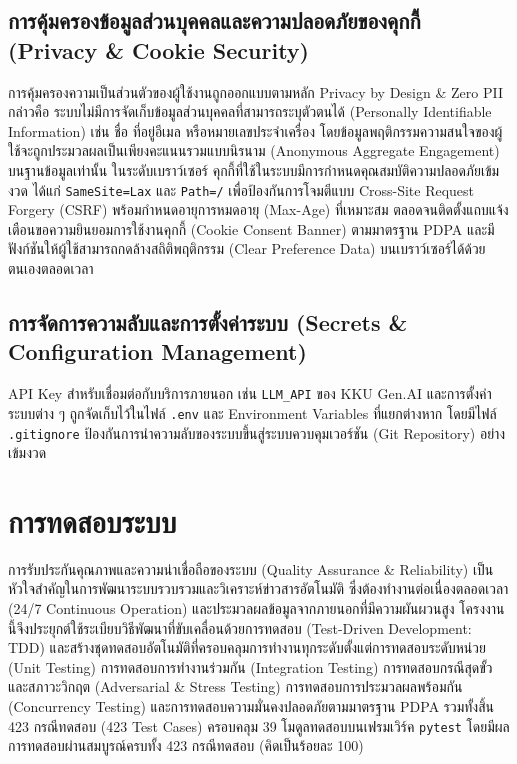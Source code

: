 \subsection{การคุ้มครองข้อมูลส่วนบุคคลและความปลอดภัยของคุกกี้ (Privacy \& Cookie Security)}

การคุ้มครองความเป็นส่วนตัวของผู้ใช้งานถูกออกแบบตามหลัก Privacy by Design \& Zero PII กล่าวคือ ระบบไม่มีการจัดเก็บข้อมูลส่วนบุคคลที่สามารถระบุตัวตนได้ (Personally Identifiable Information) เช่น ชื่อ ที่อยู่อีเมล หรือหมายเลขประจำเครื่อง โดยข้อมูลพฤติกรรมความสนใจของผู้ใช้จะถูกประมวลผลเป็นเพียงคะแนนรวมแบบนิรนาม (Anonymous Aggregate Engagement) บนฐานข้อมูลเท่านั้น ในระดับเบราว์เซอร์ คุกกี้ที่ใช้ในระบบมีการกำหนดคุณสมบัติความปลอดภัยเข้มงวด ได้แก่ \texttt{SameSite=Lax} และ \texttt{Path=/} เพื่อป้องกันการโจมตีแบบ Cross-Site Request Forgery (CSRF) พร้อมกำหนดอายุการหมดอายุ (Max-Age) ที่เหมาะสม ตลอดจนติดตั้งแถบแจ้งเตือนขอความยินยอมการใช้งานคุกกี้ (Cookie Consent Banner) ตามมาตรฐาน PDPA และมีฟังก์ชันให้ผู้ใช้สามารถกดล้างสถิติพฤติกรรม (Clear Preference Data) บนเบราว์เซอร์ได้ด้วยตนเองตลอดเวลา


\subsection{การจัดการความลับและการตั้งค่าระบบ (Secrets \& Configuration Management)}

API Key สำหรับเชื่อมต่อกับบริการภายนอก เช่น \texttt{LLM\_API} ของ KKU Gen.AI และการตั้งค่าระบบต่าง ๆ ถูกจัดเก็บไว้ในไฟล์ \texttt{.env} และ Environment Variables ที่แยกต่างหาก โดยมีไฟล์ \texttt{.gitignore} ป้องกันการนำความลับของระบบขึ้นสู่ระบบควบคุมเวอร์ชัน (Git Repository) อย่างเข้มงวด

\section{การทดสอบระบบ}

การรับประกันคุณภาพและความน่าเชื่อถือของระบบ (Quality Assurance \& Reliability) เป็นหัวใจสำคัญในการพัฒนาระบบรวบรวมและวิเคราะห์ข่าวสารอัตโนมัติ ซึ่งต้องทำงานต่อเนื่องตลอดเวลา (24/7 Continuous Operation) และประมวลผลข้อมูลจากภายนอกที่มีความผันผวนสูง โครงงานนี้จึงประยุกต์ใช้ระเบียบวิธีพัฒนาที่ขับเคลื่อนด้วยการทดสอบ (Test-Driven Development: TDD) และสร้างชุดทดสอบอัตโนมัติที่ครอบคลุมการทำงานทุกระดับตั้งแต่การทดสอบระดับหน่วย (Unit Testing) การทดสอบการทำงานร่วมกัน (Integration Testing) การทดสอบกรณีสุดขั้วและสภาวะวิกฤต (Adversarial \& Stress Testing) การทดสอบการประมวลผลพร้อมกัน (Concurrency Testing) และการทดสอบความมั่นคงปลอดภัยตามมาตรฐาน PDPA รวมทั้งสิ้น 423 กรณีทดสอบ (423 Test Cases) ครอบคลุม 39 โมดูลทดสอบบนเฟรมเวิร์ค \texttt{pytest} โดยมีผลการทดสอบผ่านสมบูรณ์ครบทั้ง 423 กรณีทดสอบ (คิดเป็นร้อยละ 100)

